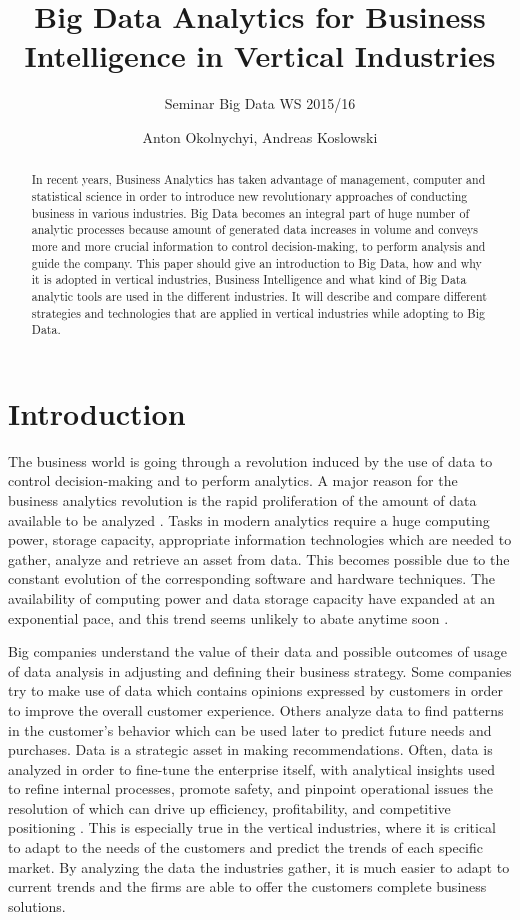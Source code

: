 \documentclass[runningheads]{llncs}
\title{Big Data Analytics for Business Intelligence in Vertical Industries}
\subtitle{Seminar Big Data WS 2015/16}
\author{Anton Okolnychyi, Andreas Koslowski}
\institute{RWTH Aachen University, 52056 Aachen, Germany\\
\{anton.okolnychyi, andreas.koslowski\}@rwth-aachen.de}
\begin{document}
\maketitle

\begin{abstract}
In recent years, Business Analytics has taken advantage of management, computer and statistical science in order to introduce new revolutionary approaches of conducting business in various industries. Big Data becomes an integral part of huge number of analytic processes because amount of generated data increases in volume and conveys more and more crucial information to control decision-making, to perform analysis and guide the company. 
This paper should give an introduction to Big Data, how and why it is adopted in vertical industries, Business Intelligence and what kind of Big Data analytic tools are used in the different industries. It will describe and compare different strategies and technologies that are applied in vertical industries while adopting to Big Data.
\end{abstract}

\section{Introduction}

The business world is going through a revolution induced by the use of data to control decision-making and to perform analytics. A major reason for the business analytics revolution is the rapid proliferation of the amount of data available to be analyzed \cite{Gopalkrishnan}. Tasks in modern analytics require a huge computing power, storage capacity, appropriate information technologies which are needed to gather, analyze and retrieve an asset from data. This becomes possible due to the constant evolution of the corresponding software and hardware techniques. The availability of computing power and data storage capacity have expanded at an exponential pace, and this trend seems unlikely to abate anytime soon \cite{NYTIMES}.  

Big companies understand the value of their data and possible outcomes of usage of data analysis in adjusting and defining their business strategy.  Some companies try to make use of data which contains opinions expressed by customers in order to improve the overall customer experience. Others analyze data to find patterns in the customer's behavior which can be used later to predict future needs and purchases. Data is a strategic asset in making recommendations. Often, data is analyzed in order to fine-tune the enterprise itself, with analytical insights used to refine internal processes, promote safety, and pinpoint operational issues the resolution of which can drive up efficiency, profitability, and competitive positioning \cite{Guszcza}.
This is especially true in the vertical industries, where it is critical to adapt to the needs of the customers and predict the trends of each specific market. By analyzing the data the industries gather, it is much easier to adapt to current trends and the firms are able to offer the customers complete business solutions.
\end{document}
